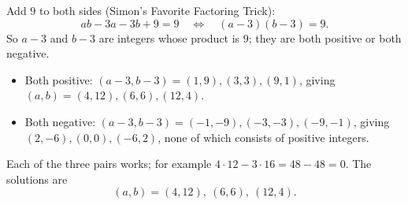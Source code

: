 Add $9$ to both sides (Simon's Favorite Factoring Trick):
\[
ab-3a-3b+9=9\quad\Longleftrightarrow\quad(a-3)(b-3)=9 .
\]
So $a-3$ and $b-3$ are integers whose product is $9$; they are both positive or both negative.
\begin{itemize}
\item Both positive: $(a-3,b-3)=(1,9),(3,3),(9,1)$, giving $(a,b)=(4,12),(6,6),(12,4)$.
\item Both negative: $(a-3,b-3)=(-1,-9),(-3,-3),(-9,-1)$, giving $(2,-6),(0,0),(-6,2)$, none of which consists of positive integers.
\end{itemize}
Each of the three pairs works; for example $4\cdot12-3\cdot16=48-48=0$. The solutions are
\[
\boxed{(a,b)=(4,12),\ (6,6),\ (12,4)} .
\]
